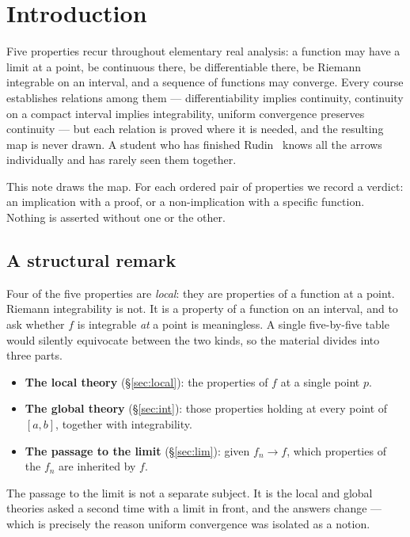 \section{Introduction}

Five properties recur throughout elementary real analysis: a function may
have a limit at a point, be continuous there, be differentiable there, be
Riemann integrable on an interval, and a sequence of functions may converge.
Every course establishes relations among them --- differentiability implies
continuity, continuity on a compact interval implies integrability, uniform
convergence preserves continuity --- but each relation is proved where it is
needed, and the resulting map is never drawn. A student who has finished
Rudin~\cite{rudin} knows all the arrows individually and has rarely seen them
together.

This note draws the map. For each ordered pair of properties we record a
verdict: an implication with a proof, or a non-implication with a specific
function. Nothing is asserted without one or the other.

\subsection*{A structural remark}

Four of the five properties are \emph{local}: they are properties of a
function at a point. Riemann integrability is not. It is a property of a
function on an interval, and to ask whether $f$ is integrable \emph{at} a
point is meaningless. A single five-by-five table would silently equivocate
between the two kinds, so the material divides into three parts.

\begin{itemize}[leftmargin=1.6em, itemsep=2pt, topsep=4pt]
  \item \textbf{The local theory} (\S\ref{sec:local}): the properties of
        $f$ at a single point $p$.
  \item \textbf{The global theory} (\S\ref{sec:int}): those properties
        holding at every point of $[a,b]$, together with integrability.
  \item \textbf{The passage to the limit} (\S\ref{sec:lim}): given
        $f_n \to f$, which properties of the $f_n$ are inherited by $f$.
\end{itemize}

The passage to the limit is not a separate subject. It is the local and
global theories asked a second time with a limit in front, and the answers
change --- which is precisely the reason uniform convergence was isolated as
a notion.


